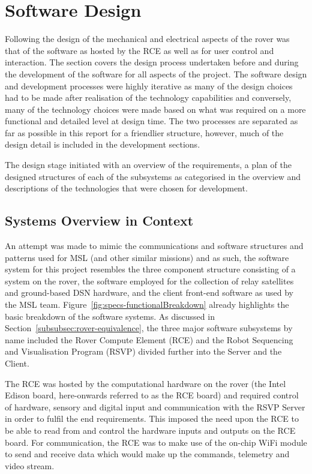 \section{Software Design}
  Following the design of the mechanical and electrical aspects of the rover was that of the software as hosted by the RCE as well as for user control and interaction. The section covers the design process undertaken before and during the development of the software for all aspects of the project. The software design and development processes were highly iterative as many of the design choices had to be made after realisation of the technology capabilities and conversely, many of the technology choices were made based on what was required on a more functional and detailed level at design time. The two processes are separated as far as possible in this report for a friendlier structure, however, much of the design detail is included in the development sections.
  
  The design stage initiated with an overview of the requirements, a plan of the designed structures of each of the subsystems as categorised in the overview and descriptions of the technologies that were chosen for development.
  
  \subsection{Systems Overview in Context}
    An attempt was made to mimic the communications and software structures and patterns used for MSL (and other similar missions) and as such, the software system for this project resembles the three component structure consisting of a system on the rover, the software employed for the collection of relay satellites and ground-based DSN hardware, and the client front-end software as used by the MSL team. Figure~\ref{fig:specs-functionalBreakdown} already highlights the basic breakdown of the software systems. As discussed in Section~\ref{subsubsec:rover-equivalence}, the three major software subsystems by name included the Rover Compute Element (RCE) and the Robot Sequencing and Visualisation Program (RSVP) divided further into the Server and the Client.
    
    The RCE was hosted by the computational hardware on the rover (the Intel Edison board, here-onwards referred to as the RCE board) and required control of hardware, sensory and digital input and communication with the RSVP Server in order to fulfil the end requirements. This imposed the need upon the RCE to be able to read from and control the hardware inputs and outputs on the RCE board. For communication, the RCE was to make use of the on-chip WiFi module to send and receive data which would make up the commands, telemetry and video stream.
    
